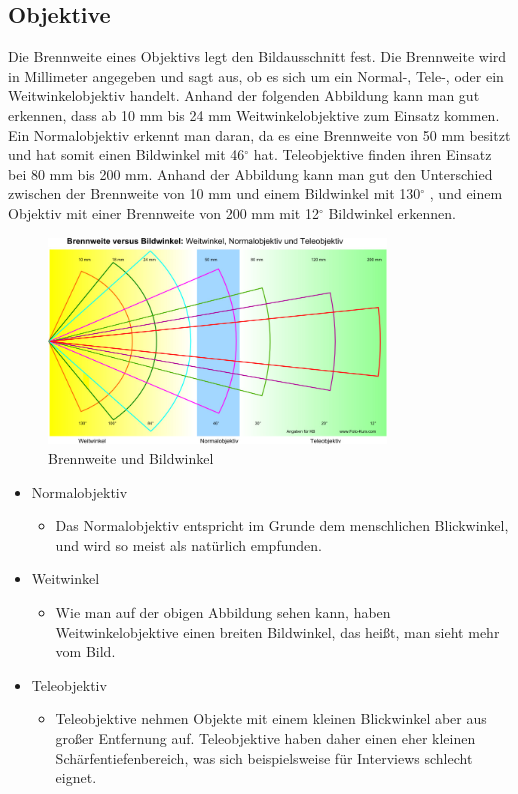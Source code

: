 \subsection{Objektive}
Die Brennweite eines Objektivs legt den Bildausschnitt fest. Die Brennweite wird in Millimeter angegeben und sagt aus, ob es sich um ein Normal-, Tele-, oder ein Weitwinkelobjektiv handelt.
Anhand der folgenden Abbildung kann man gut erkennen, dass ab 10 mm bis 24 mm Weitwinkelobjektive zum Einsatz kommen. Ein Normalobjektiv erkennt man daran, da es eine Brennweite von 50 mm besitzt und hat somit einen Bildwinkel mit 46$^\circ$ hat. Teleobjektive finden ihren Einsatz bei 80 mm bis 200 mm. Anhand der Abbildung kann man gut den Unterschied zwischen der Brennweite von 10 mm und einem Bildwinkel mit 130$^\circ$ , und einem Objektiv mit einer Brennweite von 200 mm mit 12$^\circ$ Bildwinkel erkennen. 
\begin{figure}[h]
	\centering
	\includegraphics[width=0.8\textwidth]{abb1} 
	\caption{Brennweite und Bildwinkel}
\end{figure}
\begin{itemize}
	\item Normalobjektiv
		\begin{itemize}
		\item Das Normalobjektiv entspricht im Grunde dem menschlichen Blickwinkel, und wird so meist als natürlich empfunden. 
		\end{itemize}
	\item Weitwinkel
		\begin{itemize}
		\item Wie man auf der obigen Abbildung sehen kann, haben Weitwinkelobjektive einen breiten Bildwinkel, das 	heißt, man sieht mehr vom Bild. 
		\end{itemize}
	\item Teleobjektiv
		\begin{itemize}
		\item Teleobjektive nehmen Objekte mit einem kleinen Blickwinkel aber aus großer Entfernung auf. Teleobjektive haben daher einen eher kleinen Schärfentiefenbereich, was sich beispielsweise für Interviews schlecht eignet. 
\end{itemize}
\end{itemize}
